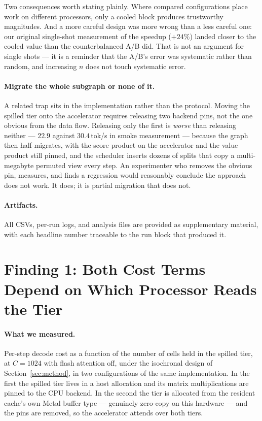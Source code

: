 \documentclass[manuscript,anonymous,review]{acmart}
\begin{document}
Two consequences worth stating plainly. Where compared configurations
place work on different processors, only a cooled block produces
trustworthy magnitudes. And a more careful design was more wrong than a
less careful one: our original single-shot measurement of the speedup
($+24\%$) landed closer to the cooled value than the counterbalanced
A/B did. That is not an argument for single shots --- it is a reminder
that the A/B's error was systematic rather than random, and increasing
$n$ does not touch systematic error.

\paragraph{Migrate the whole subgraph or none of it.} A related trap
sits in the implementation rather than the protocol. Moving the spilled
tier onto the accelerator requires releasing two backend pins, not the
one obvious from the data flow. Releasing only the first is
\emph{worse} than releasing neither --- $22.9$ against $30.4$\,tok/s in
smoke measurement --- because the graph then half-migrates, with the
score product on the accelerator and the value product still pinned,
and the scheduler inserts dozens of splits that copy a multi-megabyte
permuted view every step. An experimenter who removes the obvious pin,
measures, and finds a regression would reasonably conclude the approach
does not work. It does; it is partial migration that does not.

\paragraph{Artifacts.} All CSVs, per-run logs, and analysis files are
provided as supplementary material, with each headline number traceable
to the run block that produced it.

\section{Finding 1: Both Cost Terms Depend on Which Processor Reads
         the Tier}
\label{sec:f1}

\paragraph{What we measured.} Per-step decode cost as a function of the
number of cells held in the spilled tier, at $C = 1024$ with flash
attention off, under the isochronal design of
Section~\ref{sec:method}, in two configurations of the same
implementation. In the first the spilled tier lives in a host
allocation and its matrix multiplications are pinned to the CPU
backend. In the second the tier is allocated from the resident cache's
own Metal buffer type --- genuinely zero-copy on this hardware --- and
the pins are removed, so the accelerator attends over both tiers.
\end{document}

